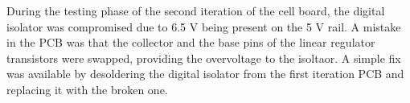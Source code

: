 During the testing phase of the second iteration of the cell board, the digital 
isolator was compromised due to 6.5 V being present on the 5 V rail. A mistake in 
the PCB was that the collector and the base pins of the linear regulator transistors
were swapped, providing the overvoltage to the isoltaor. A simple fix was available 
by desoldering the digital isolator from the first iteration PCB and replacing it 
with the broken one. 